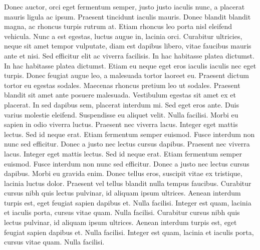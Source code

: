 Donec auctor, orci eget fermentum semper, justo justo iaculis nunc, a placerat mauris ligula ac ipsum. Praesent tincidunt iaculis mauris. Donec blandit blandit magna, ac rhoncus turpis rutrum at. Etiam rhoncus leo porta nisl eleifend vehicula. Nunc a est egestas, luctus augue in, lacinia orci. Curabitur ultricies, neque sit amet tempor vulputate, diam est dapibus libero, vitae faucibus mauris ante et nisi. Sed efficitur elit ac viverra facilisis. In hac habitasse platea dictumst. In hac habitasse platea dictumst. Etiam eu neque eget eros iaculis iaculis nec eget turpis.\newpar
Donec feugiat augue leo, a malesuada tortor laoreet eu. Praesent dictum tortor eu egestas sodales. Maecenas rhoncus pretium leo ut sodales. Praesent blandit sit amet ante posuere malesuada. Vestibulum egestas sit amet ex et placerat. In sed dapibus sem, placerat interdum mi. Sed eget eros ante. Duis varius molestie eleifend. Suspendisse eu aliquet velit. Nulla facilisi. Morbi eu sapien in odio viverra luctus. Praesent nec viverra lacus. Integer eget mattis lectus. Sed id neque erat. Etiam fermentum semper euismod. Fusce interdum non nunc sed efficitur. Donec a justo nec lectus cursus dapibus.\newpar
Praesent nec viverra lacus. Integer eget mattis lectus. Sed id neque erat. Etiam fermentum semper euismod. Fusce interdum non nunc sed efficitur. Donec a justo nec lectus cursus dapibus. Morbi eu gravida enim. Donec tellus eros, suscipit vitae ex tristique, lacinia luctus dolor. Praesent vel tellus blandit nulla tempus faucibus. Curabitur cursus nibh quis lectus pulvinar, id aliquam ipsum ultrices. Aenean interdum turpis est, eget feugiat sapien dapibus et. Nulla facilisi. Integer est quam, lacinia et iaculis porta, cursus vitae quam. Nulla facilisi. Curabitur cursus nibh quis lectus pulvinar, id aliquam ipsum ultrices. Aenean interdum turpis est, eget feugiat sapien dapibus et. Nulla facilisi. Integer est quam, lacinia et iaculis porta, cursus vitae quam. Nulla facilisi.